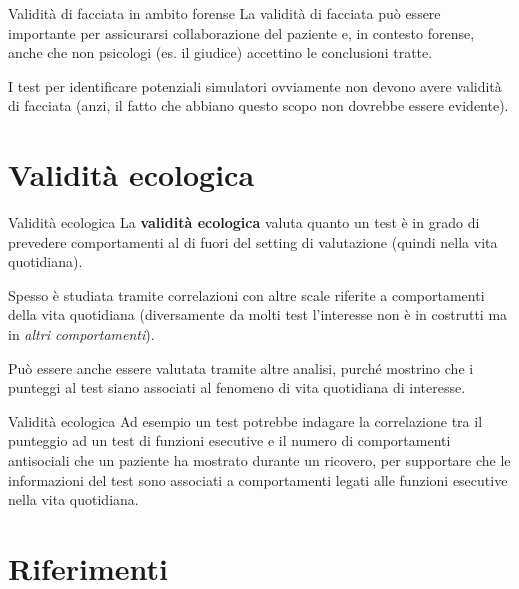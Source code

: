 \documentclass[
  ignorenonframetext,
  aspectratio=169,
]{beamer}
\begin{document}
\begin{frame}{Validità di facciata in ambito forense}
\label{validituxe0-di-facciata-in-ambito-forense}
La validità di facciata può essere importante per assicurarsi
collaborazione del paziente e, in contesto forense, anche che non
psicologi (es. il giudice) accettino le conclusioni tratte.

I test per identificare potenziali simulatori ovviamente non devono
avere validità di facciata (anzi, il fatto che abbiano questo scopo non
dovrebbe essere evidente).
\end{frame}

\section{Validità ecologica}\label{validituxe0-ecologica}

\begin{frame}{Validità ecologica}
\label{validituxe0-ecologica-1}
La \textbf{validità ecologica} valuta quanto un test è in grado di
prevedere comportamenti al di fuori del setting di valutazione (quindi
nella vita quotidiana).

Spesso è studiata tramite correlazioni con altre scale riferite a
comportamenti della vita quotidiana (diversamente da molti test
l'interesse non è in costrutti ma in \emph{altri comportamenti}).

Può essere anche essere valutata tramite altre analisi, purché mostrino
che i punteggi al test siano associati al fenomeno di vita quotidiana di
interesse.
\end{frame}

\begin{frame}{Validità ecologica}
\label{validituxe0-ecologica-2}
Ad esempio un test potrebbe indagare la correlazione tra il punteggio ad
un test di funzioni esecutive e il numero di comportamenti antisociali
che un paziente ha mostrato durante un ricovero, per supportare che le
informazioni del test sono associati a comportamenti legati alle
funzioni esecutive nella vita quotidiana.
\end{frame}

\section{Riferimenti}\label{riferimenti}
\end{document}
